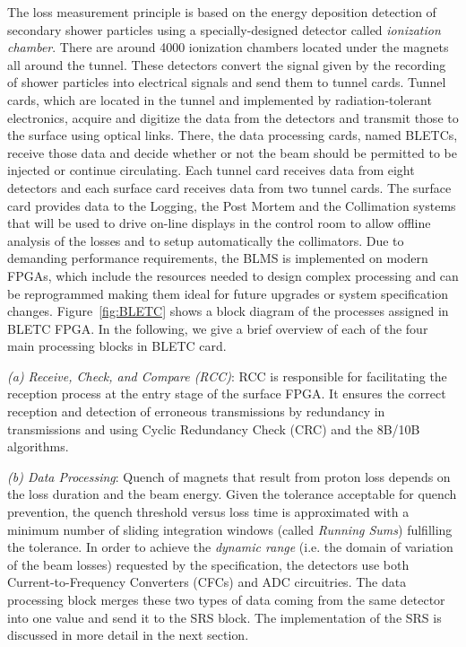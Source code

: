 \documentclass{llncs}
\begin{document}
The loss measurement principle \cite{Dehning-IPAC,Chris-FPGA} is based on the energy deposition detection of secondary shower particles using a specially-designed detector called \emph{ionization chamber}. There are around 4000 ionization chambers located under the magnets all around the tunnel. These detectors convert the signal given by the recording of shower particles into electrical signals and send them to tunnel cards. Tunnel cards, which are located in the tunnel and implemented by radiation-tolerant electronics, acquire and digitize the data from the detectors and transmit those to the surface using optical links. There, the data processing cards, named BLETCs, receive those data and decide whether or not the beam should be permitted to be injected or continue circulating. Each tunnel card receives data from eight detectors and each surface card receives data from two tunnel cards. The surface card provides data to the Logging, the Post Mortem and the Collimation systems that will be used to drive on-line displays in the control room to allow offline analysis of the losses and to setup automatically the collimators. Due to demanding performance requirements, the BLMS is implemented on modern FPGAs, which include the resources needed to design complex processing and can be reprogrammed making them ideal for future upgrades or system specification changes. Figure~\ref{fig:BLETC} shows a block diagram of the processes assigned in BLETC FPGA. In the following, we give a brief overview of each of the four main processing blocks in BLETC card.


\emph{(a) Receive, Check, and Compare (RCC)}: RCC is responsible for facilitating the reception process at the entry stage of the surface FPGA. It ensures the correct reception and detection of erroneous transmissions by redundancy in transmissions and using Cyclic Redundancy Check (CRC) and the 8B/10B algorithms.

\emph{(b) Data Processing}: Quench of magnets that result from proton loss depends on the loss duration and the beam energy. Given the tolerance acceptable for quench prevention, the quench threshold versus loss time is approximated with a minimum number of sliding integration windows (called \emph{Running Sums}) fulfilling the tolerance. In order to achieve the \emph{dynamic range} (i.e. the domain of variation of the beam losses) requested by the specification, the detectors use both Current-to-Frequency Converters (CFCs) and ADC circuitries. The data processing block merges these two types of data coming from the same detector into one value and send it to the SRS block. The implementation of the SRS is discussed in more detail in the next section.
\end{document}
